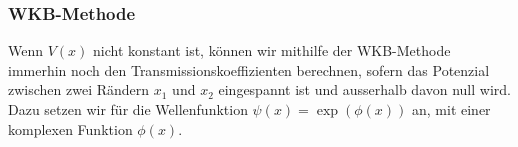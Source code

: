 \subsubsection{WKB-Methode}
Wenn $V(x)$ nicht konstant ist, können wir mithilfe der WKB-Methode 
\cite{froman1970transmission}
immerhin noch den Transmissionskoeffizienten berechnen, sofern
das Potenzial zwischen zwei Rändern $x_1$ und $x_2$ eingespannt ist 
und ausserhalb davon null wird. Dazu setzen wir für die 
Wellenfunktion $\psi(x)=\exp(\phi(x))$ an, 
mit einer komplexen Funktion $\phi(x)$. 

